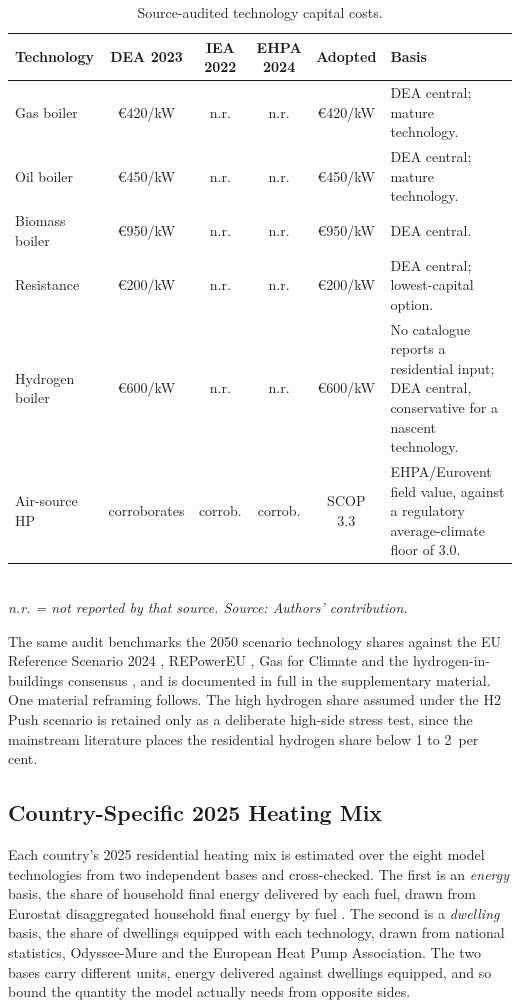 \begin{table}[htbp]
  \centering
  \caption{Source-audited technology capital costs.}
  \label{tab:costopt_audit}
  \footnotesize
  \begin{tabularx}{\textwidth}{@{}l c c c c X@{}}
    \toprule
    Technology & DEA 2023 & IEA 2022 & EHPA 2024 & Adopted & Basis \\
    \midrule
    Gas boiler        & \euro{}420/kW & n.r. & n.r. & \euro{}420/kW & DEA central; mature technology. \\
    Oil boiler        & \euro{}450/kW & n.r. & n.r. & \euro{}450/kW & DEA central; mature technology. \\
    Biomass boiler    & \euro{}950/kW & n.r. & n.r. & \euro{}950/kW & DEA central. \\
    Resistance        & \euro{}200/kW & n.r. & n.r. & \euro{}200/kW & DEA central; lowest-capital option. \\
    Hydrogen boiler   & \euro{}600/kW & n.r. & n.r. & \euro{}600/kW & No catalogue reports a residential input; DEA central, conservative for a nascent technology. \\
    Air-source HP     & corroborates  & corrob. & corrob. & SCOP 3.3 & EHPA/Eurovent field value, against a regulatory average-climate floor of 3.0. \\
    \bottomrule
  \end{tabularx}
  \\[8pt]{\footnotesize\textit{n.r. = not reported by that source. Source: Authors' contribution.}}
\end{table}

The same audit benchmarks the 2050 scenario technology shares against the EU
Reference Scenario 2024 \citep{EC2024RefScenario}, REPowerEU
\citep{REpowerEU2022}, Gas for Climate \citep{GasForClimate2050} and the
hydrogen-in-buildings consensus \citep{ICCT2023h2heating, H2ScienceCoalition},
and is documented in full in the supplementary material. One material reframing follows. The
high hydrogen share assumed under the H2 Push scenario is retained only as a
deliberate high-side stress test, since the mainstream literature places the
residential hydrogen share below 1 to 2~per cent.

\subsection{Country-Specific 2025 Heating Mix}
Each country's 2025 residential heating mix is estimated over the eight model
technologies from two independent bases and cross-checked. The first is an
\emph{energy} basis, the share of household final energy delivered by each fuel,
drawn from Eurostat disaggregated household final energy by fuel
\citep{Eurostat2024nrgdhhq}. The second is a \emph{dwelling} basis, the share of
dwellings equipped with each technology, drawn from national statistics,
Odyssee-Mure \citep{OdysseeMure} and the European Heat Pump Association. The two
bases carry different units, energy delivered against dwellings equipped, and so
bound the quantity the model actually needs from opposite sides.

